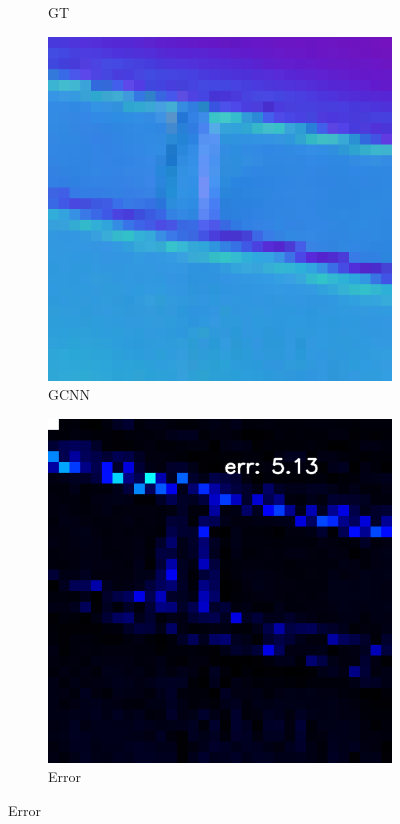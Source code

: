 \begin{figure}
\begin{subfigure}[b]{0.24\linewidth}
		\caption{GT}
	\end{subfigure}
	\begin{subfigure}[b]{0.24\linewidth}
		\includegraphics[width=\linewidth]{./Figures/gcnn_synthetic/eval_9_normal_an2-8-1000.png}
		\caption{GCNN}
	\end{subfigure}
	\begin{subfigure}[b]{0.24\linewidth}
		\includegraphics[width=\linewidth]{./Figures/gcnn_synthetic/eval_9_error_an2-8-1000.png}
		\caption{Error}
	\end{subfigure}
	

\end{figure}
